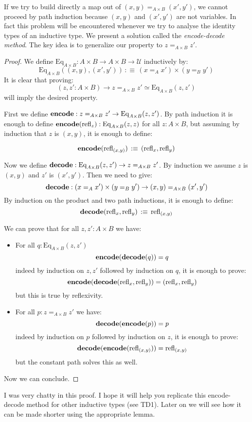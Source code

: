 \documentclass{article}
\newcommand{\encode}{\mathrm{\bf encode}}
\newcommand{\decode}{\mathrm{\bf decode}}
\newcommand{\U}{{\mathcal U}}
\renewcommand{\r}{\rightarrow}
\newcommand{\refl}{\mathrm{refl}}
\begin{document}
If we try to build directly a map out of $(x,y)=_{A\times B}(x',y')$, we cannot proceed by path induction because $(x,y)$ and $(x',y')$ are not variables. In fact this problem will be encountered whenever we try to analyse the identity types of an inductive type. We present a solution called the \emph{encode-decode method}. The key idea is to generalize our property to $z=_{A\times B} z'$.

\begin{proof}
We define $\mathrm{Eq}_{A\times B} : A\times B \r A\times B \r \U$ inductively by:
\[\mathrm{Eq}_{A\times B}((x,y),(x',y')) \, :\equiv \, (x=_Ax')\times (y=_By')\]
It is clear that proving:
\[(z,z':A\times B) \r z=_{A\times B} z' \simeq \mathrm{Eq}_{A\times B}(z,z')\]
will imply the desired property.


First we define $\encode : z=_{A\times B} z' \r \mathrm{Eq}_{A\times B}(z,z')$. By path induction it is enough to define $\encode(\refl_z) :\mathrm{Eq}_{A\times B}(z,z)$ for all $z:A\times B$, but assuming by induction that $z$ is $(x,y)$, it is enough to define: %

\[\encode(\refl_{(x,y)})\,  :\equiv\, (\refl_x,\refl_y)\] 

Now we define $\decode : \mathrm{Eq}_{A\times B}(z,z') \r z=_{A\times B} z'$. By induction we assume $z$ is $(x,y)$ and $z'$ is $(x',y')$. Then we need to give:
\[\decode : (x=_Ax')\times (y=_By') \r (x,y)=_{A\times B}(x',y')\]
By induction on the product and two path inductions, it is enough to define:
\[\decode(\refl_x,\refl_y) \, :\equiv \, \refl_{(x,y)}\]

We can prove that for all $z,z':A\times B$ we have:
\begin{itemize}
\item For all $q:\mathrm{Eq}_{A\times B}(z,z')$
\[\encode (\decode(q)) = q\] 
indeed by induction on $z,z'$ followed by induction on $q$, it is enough to prove:
\[\encode(\decode(\refl_x,\refl_y)) = (\refl_x,\refl_y)\]
but this is true by reflexivity.
\item For all $p:z=_{A\times B} z'$ we have:
\[\decode(\encode(p))=p\]
indeed by induction on $p$ followed by induction on $z$, it is enough to prove:
\[\decode(\encode(\refl_{(x,y)})) = \refl_{(x,y)}\]
but the constant path solves this as well.
\end{itemize}
Now we can conclude.
\end{proof}

I was very chatty in this proof. I hope it will help you replicate this encode-decode method for other inductive types (see TD1). Later on we will see how it can be made shorter using the appropriate lemma. 
\end{document}
